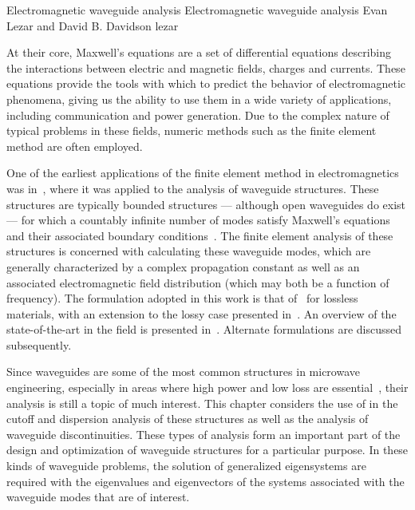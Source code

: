               {Electromagnetic waveguide analysis}
              {Electromagnetic waveguide analysis}
              {Evan Lezar and David B. Davidson}
              {lezar}


At their core, Maxwell's equations are a
set of differential equations describing the interactions between
electric and magnetic fields, charges and currents. These equations
provide the tools with which to predict the behavior of
electromagnetic phenomena, giving us the
ability to use them in a wide variety of applications, including
communication and power generation. Due to the complex nature of
typical problems in these fields, numeric methods such as the finite
element method are often employed.

One of the earliest applications of the finite element method in
electromagnetics was in~\citet{Silvester1969}, where it was applied to
the analysis of waveguide structures. These
structures are typically bounded structures --- although open
waveguides do exist --- for which a countably infinite number of modes
satisfy Maxwell's equations and their associated boundary
conditions~\citep{Pozar2005}. The finite element analysis of these
structures is concerned with calculating these waveguide modes, which
are generally characterized by a complex propagation constant as well
as an associated electromagnetic field distribution (which may both be
a function of frequency). The formulation adopted in this work is that
of~\citet{LeeSunCendes1991} for lossless materials, with an extension
to the lossy case presented in~\citet{Lee1994}. An overview of the
state-of-the-art in the field is presented
in~\citet{Davidson2011}. Alternate formulations are discussed
subsequently.

Since waveguides are some of the most common structures in microwave
engineering, especially in areas where high power and low loss are
essential~\citep{Pozar2005}, their analysis is still a topic of much
interest. This chapter considers the use of \fenics{} in the cutoff
and dispersion analysis of these structures as well as the analysis of
waveguide discontinuities. These types of analysis form an important part
of the design and optimization of waveguide structures for a particular
purpose. In these kinds of waveguide problems, the solution of generalized
eigensystems are required with the eigenvalues and eigenvectors of the
systems associated with the waveguide modes that are of interest.

